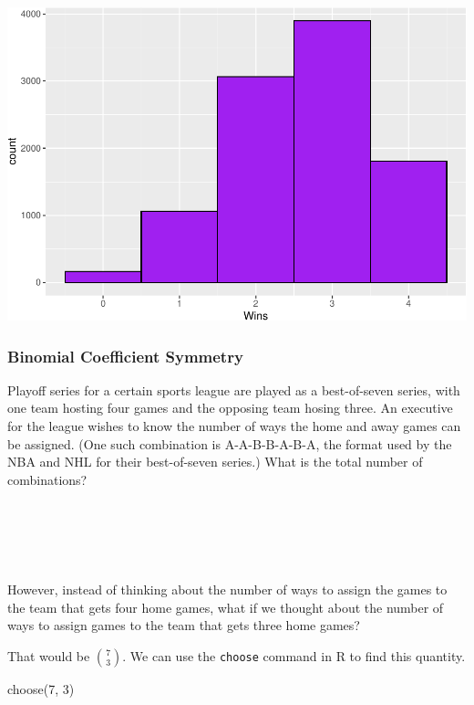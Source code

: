 \documentclass[
  11pt,
]{book}
\newenvironment{Shaded}{\begin{snugshade}}{\end{snugshade}}
\newcommand{\DecValTok}[1]{\textcolor[rgb]{0.00,0.00,0.81}{#1}}
\newcommand{\FunctionTok}[1]{\textcolor[rgb]{0.00,0.00,0.00}{#1}}
\newcommand{\NormalTok}[1]{#1}
\theoremstyle{definition}
\theoremstyle{definition}
\theoremstyle{definition}
\theoremstyle{definition}
\theoremstyle{remark}
\begin{document}
\includegraphics{series_files/figure-latex/unnamed-chunk-46-1.pdf}

\hypertarget{binomial-coefficient-symmetry}{%
\subsubsection{Binomial Coefficient Symmetry}\label{binomial-coefficient-symmetry}}

Playoff series for a certain sports league are played as a best-of-seven series, with one team hosting four games and the opposing team hosing three. An executive for the league wishes to know the number of ways the home and away games can be assigned. (One such combination is A-A-B-B-A-B-A, the format used by the NBA and NHL for their best-of-seven series.) What is the total number of combinations?\\
\strut \\
\strut \\
\strut \\

However, instead of thinking about the number of ways to assign the games to the team that gets four home games, what if we thought about the number of ways to assign games to the team that gets three home games?

That would be \(\binom{7}{3}\). We can use the \texttt{choose} command in R to find this quantity.

\begin{Shaded}
\begin{Highlighting}[]
\FunctionTok{choose}\NormalTok{(}\DecValTok{7}\NormalTok{, }\DecValTok{3}\NormalTok{)}
\end{Highlighting}
\end{Shaded}
\end{document}
